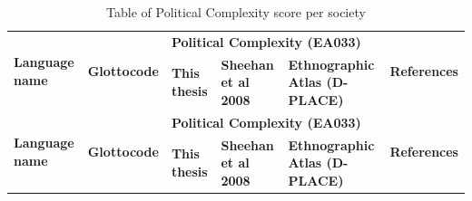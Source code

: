\documentclass[draft,10pt]{article} %
\begin{document}
\begin{landscape}
\begin{longtable}{ | p{2cm}| p{2cm}| p{1.8cm}| p{1.8cm}| p{3cm}| p{9cm}| }

\caption{{Table of Political Complexity score per society}} 
\label{pol_complex_table}\\
\hline
\multirow{2}{*}{\parbox{2cm}{\textbf{Language name}}} &\multirow{2}{*}{\textbf{Glottocode}}&  \multicolumn{3}{p{6.6cm}|}{\textbf{Political Complexity (EA033)}} & \multirow{2}{*}{\textbf{References}} \\ \cline{3-5}
&& \textbf{This thesis}& \textbf{Sheehan et al 2008}& \textbf{Ethnographic Atlas (D-PLACE)}&\\ \hline




\endfirsthead

\hline
\multirow{2}{*}{\parbox{2cm}{\textbf{Language name}}} &\multirow{2}{*}{\textbf{Glottocode}}&  \multicolumn{3}{p{6.6cm}|}{\textbf{Political Complexity (EA033)}} & \multirow{2}{*}{\textbf{References}} \\ \cline{3-5}
&& \textbf{This thesis}& \textbf{Sheehan et al 2008}& \textbf{Ethnographic Atlas (D-PLACE)}&\\ \hline

\endhead


\end{longtable}
\end{landscape}
\end{document}

